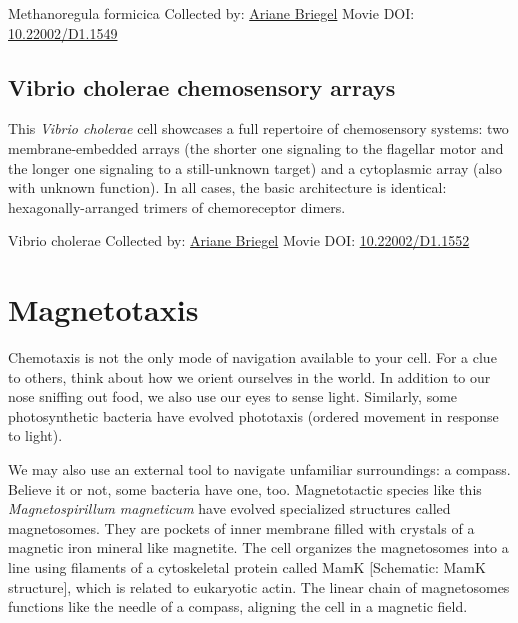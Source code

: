 \documentclass[]{tufte-book}
\begin{document}
\hypertarget{htmlwidget-1996c44f8d0e7eaab461}{}

\label{fig:7-5}Methanoregula formicica Collected by: \protect\hyperlink{ariane_briegel}{Ariane Briegel} Movie DOI: \href{https://doi.org/10.22002/D1.1549}{10.22002/D1.1549}

\hypertarget{Vibrio_cholerae_chemosensory_arrays}{%
\subsection{Vibrio cholerae chemosensory arrays}\label{Vibrio_cholerae_chemosensory_arrays}}

This \emph{Vibrio cholerae} cell showcases a full repertoire of chemosensory systems: two membrane-embedded arrays (the shorter one signaling to the flagellar motor and the longer one signaling to a still-unknown target) and a cytoplasmic array (also with unknown function). In all cases, the basic architecture is identical: hexagonally-arranged trimers of chemoreceptor dimers.



\hypertarget{htmlwidget-ce2b445770051c79b17e}{}

\label{fig:7-5a}Vibrio cholerae Collected by: \protect\hyperlink{ariane_briegel}{Ariane Briegel} Movie DOI: \href{https://doi.org/10.22002/D1.1552}{10.22002/D1.1552}

\hypertarget{magnetotaxis}{%
\section{Magnetotaxis}\label{magnetotaxis}}

Chemotaxis is not the only mode of navigation available to your cell. For a clue to others, think about how we orient ourselves in the world. In addition to our nose sniffing out food, we also use our eyes to sense light. Similarly, some photosynthetic bacteria have evolved phototaxis (ordered movement in response to light).

We may also use an external tool to navigate unfamiliar surroundings: a compass. Believe it or not, some bacteria have one, too. Magnetotactic species like this \emph{Magnetospirillum magneticum} have evolved specialized structures called magnetosomes. They are pockets of inner membrane filled with crystals of a magnetic iron mineral like magnetite. The cell organizes the magnetosomes into a line using filaments of a cytoskeletal protein called MamK {[}Schematic: MamK structure{]}, which is related to eukaryotic actin. The linear chain of magnetosomes functions like the needle of a compass, aligning the cell in a magnetic field.
\end{document}
